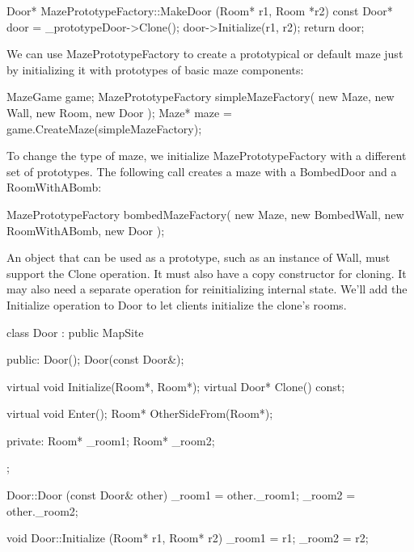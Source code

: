 \documentclass{report}
\begin{document}
\begin{itemize}
\begin{cppcode}
                Door* MazePrototypeFactory::MakeDoor (Room* r1, Room *r2) const {
                    Door* door = _prototypeDoor->Clone();
                    door->Initialize(r1, r2);
                    return door;
                }
            \end{cppcode}
            \bigbreak \noindent 
            We can use MazePrototypeFactory to create a prototypical or default maze just by initializing it with prototypes of basic maze components:
            \bigbreak \noindent 
            \begin{cppcode}
                MazeGame game;
                MazePrototypeFactory simpleMazeFactory(
                    new Maze, new Wall, new Room, new Door
                );
                Maze* maze = game.CreateMaze(simpleMazeFactory);
            \end{cppcode}
            \bigbreak \noindent 
            To change the type of maze, we initialize MazePrototypeFactory with a different set of prototypes. The following call creates a maze with a BombedDoor and a RoomWithABomb:
            \bigbreak \noindent 
            \begin{cppcode}
                MazePrototypeFactory bombedMazeFactory(
                    new Maze, new BombedWall, new RoomWithABomb, new Door
                );
            \end{cppcode}
            \bigbreak \noindent 
            An object that can be used as a prototype, such as an instance of Wall, must support the Clone operation. It must also have a copy constructor for cloning. It may also need a separate operation for reinitializing internal state. We'll add the Initialize operation to Door to let clients initialize the clone's rooms.
            \bigbreak \noindent 
            \begin{cppcode}
                class Door : public MapSite {
                public:
                    Door();
                    Door(const Door&);

                    virtual void Initialize(Room*, Room*);
                    virtual Door* Clone() const;

                    virtual void Enter();
                    Room* OtherSideFrom(Room*);

                private:
                    Room* _room1;
                    Room* _room2;
                };

                Door::Door (const Door& other) {
                    _room1 = other._room1;
                    _room2 = other._room2;
                }
            \end{cppcode}
            \bigbreak \noindent 
            \begin{cppcode}
                void Door::Initialize (Room* r1, Room* r2) {
                    _room1 = r1;
                    _room2 = r2;
                }


\end{cppcode}
\end{itemize}
\end{document}
